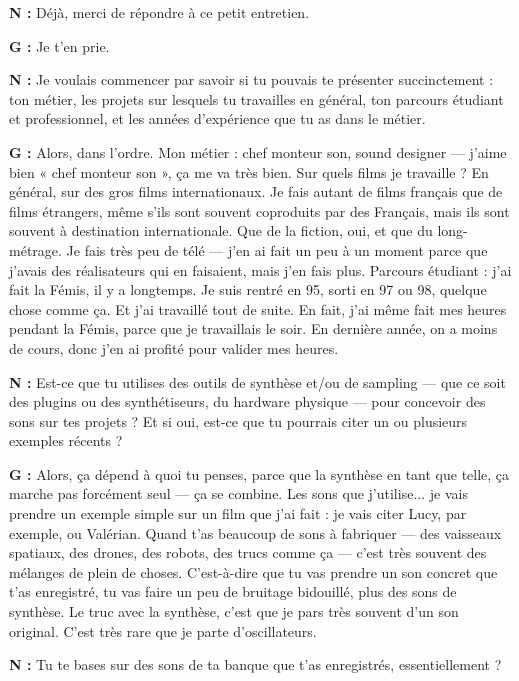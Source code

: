 ﻿\documentclass[12pt]{article}
\begin{document}
\textbf{N :} Déjà, merci de répondre à ce petit entretien.

\textbf{G :} Je t'en prie.

\textbf{N :} Je voulais commencer par savoir si tu pouvais te présenter succinctement : ton métier, les projets sur lesquels tu travailles en général, ton parcours étudiant et professionnel, et les années d'expérience que tu as dans le métier.

\textbf{G :} Alors, dans l'ordre. Mon métier : chef monteur son, sound designer — j'aime bien « chef monteur son », ça me va très bien. Sur quels films je travaille ? En général, sur des gros films internationaux. Je fais autant de films français que de films étrangers, même s'ils sont souvent coproduits par des Français, mais ils sont souvent à destination internationale. Que de la fiction, oui, et que du long-métrage. Je fais très peu de télé — j'en ai fait un peu à un moment parce que j'avais des réalisateurs qui en faisaient, mais j'en fais plus. Parcours étudiant : j'ai fait la Fémis, il y a longtemps. Je suis rentré en 95, sorti en 97 ou 98, quelque chose comme ça. Et j'ai travaillé tout de suite. En fait, j'ai même fait mes heures pendant la Fémis, parce que je travaillais le soir. En dernière année, on a moins de cours, donc j'en ai profité pour valider mes heures.

\textbf{N :} Est-ce que tu utilises des outils de synthèse et/ou de sampling — que ce soit des plugins ou des synthétiseurs, du hardware physique — pour concevoir des sons sur tes projets ? Et si oui, est-ce que tu pourrais citer un ou plusieurs exemples récents ?

\textbf{G :} Alors, ça dépend à quoi tu penses, parce que la synthèse en tant que telle, ça marche pas forcément seul — ça se combine. Les sons que j'utilise... je vais prendre un exemple simple sur un film que j'ai fait : je vais citer Lucy, par exemple, ou Valérian. Quand t'as beaucoup de sons à fabriquer — des vaisseaux spatiaux, des drones, des robots, des trucs comme ça — c'est très souvent des mélanges de plein de choses. C'est-à-dire que tu vas prendre un son concret que t'as enregistré, tu vas faire un peu de bruitage bidouillé, plus des sons de synthèse. Le truc avec la synthèse, c'est que je pars très souvent d'un son original. C'est très rare que je parte d'oscillateurs.

\textbf{N :} Tu te bases sur des sons de ta banque que t'as enregistrés, essentiellement ?
\end{document}

